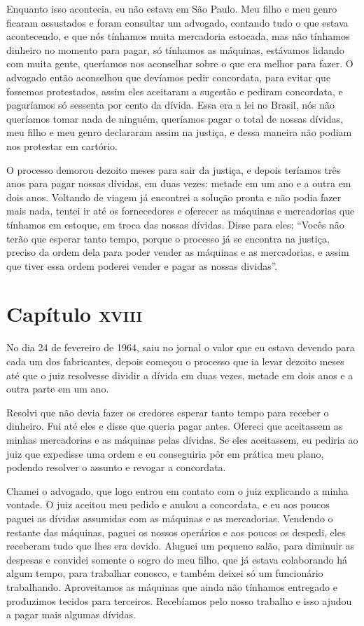 Enquanto isso acontecia, eu não estava em São Paulo. Meu filho e meu
genro ficaram assustados e foram consultar um advogado, contando tudo o
que estava acontecendo, e que nós tínhamos muita mercadoria estocada,
mas não tínhamos dinheiro no momento para pagar, só tínhamos as
máquinas, estávamos lidando com muita gente, queríamos nos aconselhar
sobre o que era melhor para fazer. O advogado então aconselhou que
devíamos pedir concordata, para evitar que fossemos protestados, assim
eles aceitaram a sugestão e pediram concordata, e pagaríamos só sessenta
por cento da dívida. Essa era a lei no Brasil, nós não queríamos tomar
nada de ninguém, queríamos pagar o total de nossas dívidas, meu filho e
meu genro declararam assim na justiça, e dessa maneira não podiam nos
protestar em cartório.

O processo demorou dezoito meses para sair da justiça, e depois teríamos
três anos para pagar nossas dívidas, em duas vezes: metade em um ano e a
outra em dois anos. Voltando de viagem já encontrei a solução pronta e
não podia fazer mais nada, tentei ir até os fornecedores e oferecer as
máquinas e mercadorias que tínhamos em estoque, em troca das nossas
dívidas. Disse para eles; ``Vocês não terão que esperar tanto tempo,
porque o processo já se encontra na justiça, preciso da ordem dela para
poder vender as máquinas e as mercadorias, e assim que tiver essa ordem
poderei vender e pagar as nossas dividas''.

\chapter{Capítulo \textsc{xviii}}

No dia 24 de fevereiro de 1964, saiu no jornal o valor que eu estava
devendo para cada um dos fabricantes, depois começou o processo que ia
levar dezoito meses até que o juiz resolvesse dividir a dívida em duas
vezes, metade em dois anos e a outra parte em um ano.

Resolvi que não devia fazer os credores esperar tanto tempo para receber
o dinheiro. Fui até eles e disse que queria pagar antes. Ofereci que
aceitassem as minhas mercadorias e as máquinas pelas dívidas. Se eles
aceitassem, eu pediria ao juiz que expedisse uma ordem e eu conseguiria
pôr em prática meu plano, podendo resolver o assunto e revogar a
concordata.

Chamei o advogado, que logo entrou em contato com o juiz explicando a
minha vontade. O juiz aceitou meu pedido e anulou a concordata, e eu aos
poucos paguei as dívidas assumidas com as máquinas e as mercadorias.
Vendendo o restante das máquinas, paguei os nossos operários e aos
poucos os despedi, eles receberam tudo que lhes era devido. Aluguei um
pequeno salão, para diminuir as despesas e convidei somente o sogro do
meu filho, que já estava colaborando há algum tempo, para trabalhar
conosco, e também deixei só um funcionário trabalhando. Aproveitamos as
máquinas que ainda não tínhamos entregado e produzimos tecidos para
terceiros. Recebíamos pelo nosso trabalho e isso ajudou a pagar mais
algumas dívidas.

